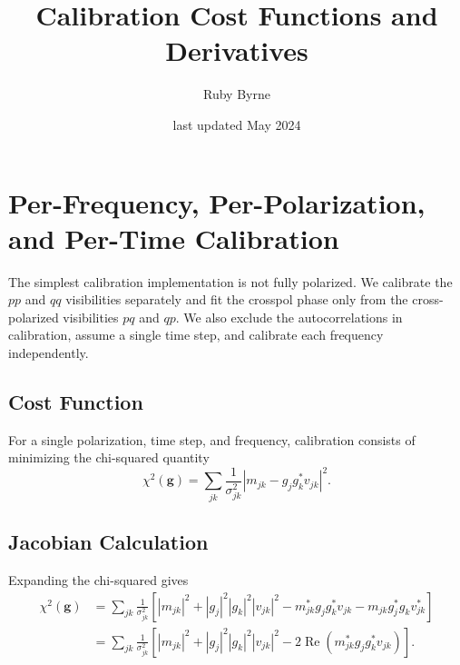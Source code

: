 \documentclass{article}
\title{Calibration Cost Functions and Derivatives}
\author{Ruby Byrne}
\date{last updated May 2024}
\newcommand\re{\operatorname{Re}}
\begin{document}
\maketitle

\section{Per-Frequency, Per-Polarization, and Per-Time Calibration}

The simplest calibration implementation is not fully polarized. We calibrate the $pp$ and $qq$ visibilities separately and fit the crosspol phase only from the cross-polarized visibilities $pq$ and $qp$. We also exclude the autocorrelations in calibration, assume a single time step, and calibrate each frequency independently.

\subsection{Cost Function}

For a single polarization, time step, and frequency, calibration consists of minimizing the chi-squared quantity
\begin{equation}
    \chi^2(\boldsymbol{g}) = \sum_{jk} \frac{1}{\sigma_{jk}^2} \left| m_{jk} - g_j g_k^* v_{jk} \right|^2.
\end{equation}

\subsection{Jacobian Calculation}
\label{s:simplest_jac}

Expanding the chi-squared gives
\begin{equation}
\begin{split}
    \chi^2(\boldsymbol{g}) &= \sum_{jk} \frac{1}{\sigma_{jk}^2} \left[ |m_{jk}|^2 + |g_j|^2 |g_k|^2 |v_{jk}|^2 - m_{jk}^* g_j g_k^* v_{jk} - m_{jk} g_j^* g_k v_{jk}^* \right] \\
    &= \sum_{jk} \frac{1}{\sigma_{jk}^2} \left[ |m_{jk}|^2 + |g_j|^2 |g_k|^2 |v_{jk}|^2 - 2 \re \left( m_{jk}^* g_j g_k^* v_{jk} \right) \right].
\end{split}
\end{equation}
\end{document}
